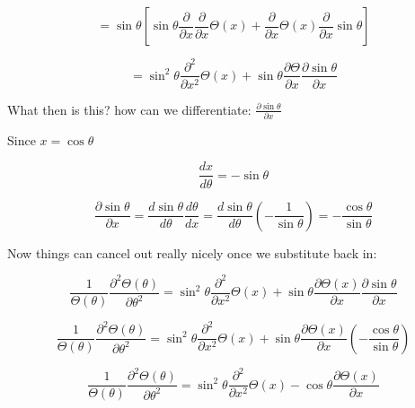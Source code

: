 \documentclass[12pt]{article}
\renewcommand{\_}{\kern-1.5pt\textunderscore\kern-1.5pt}
\begin{document}
 \[ =\sin  \theta  \left[ \sin  \theta \frac{ \partial }{ \partial x}\frac{ \partial }{ \partial x} \Theta  \left( x \right) +\frac{ \partial }{ \partial x} \Theta  \left( x \right) \frac{ \partial }{ \partial x}\sin  \theta  \right]  \] \par

 \[ =\sin ^{2} \theta \frac{ \partial ^{2}}{ \partial x^{2}} \Theta  \left( x \right) +\sin  \theta \frac{ \partial  \Theta }{ \partial x}\frac{ \partial \sin  \theta }{ \partial x} \] \par

What then is this? how can we differentiate:  \( \frac{ \partial \sin  \theta }{ \partial x} \) \par

Since  \( x=\cos  \theta  \) \par

 \[ \frac{dx}{d \theta }=-\sin  \theta  \] \par

 \[ \frac{ \partial \sin  \theta }{ \partial x}=\frac{d\sin  \theta }{d \theta }\frac{d \theta }{dx}=\frac{d\sin  \theta }{d \theta } \left( -\frac{1}{\sin  \theta } \right) =-\frac{\cos  \theta }{\sin  \theta } \] \par

Now things can cancel out really nicely once we substitute back in:\par

 \[ \frac{1}{ \Theta  \left(  \theta  \right) }\frac{ \partial ^{2} \Theta  \left(  \theta  \right) }{ \partial  \theta ^{2}}=\sin ^{2} \theta \frac{ \partial ^{2}}{ \partial x^{2}} \Theta  \left( x \right) +\sin  \theta \frac{ \partial  \Theta  \left( x \right) }{ \partial x}\frac{ \partial \sin  \theta }{ \partial x} \] \par

 \[ \frac{1}{ \Theta  \left(  \theta  \right) }\frac{ \partial ^{2} \Theta  \left(  \theta  \right) }{ \partial  \theta ^{2}}=\sin ^{2} \theta \frac{ \partial ^{2}}{ \partial x^{2}} \Theta  \left( x \right) +\sin  \theta \frac{ \partial  \Theta  \left( x \right) }{ \partial x} \left( -\frac{\cos  \theta }{\sin  \theta } \right)  \] \par

 \[ \frac{1}{ \Theta  \left(  \theta  \right) }\frac{ \partial ^{2} \Theta  \left(  \theta  \right) }{ \partial  \theta ^{2}}=\sin ^{2} \theta \frac{ \partial ^{2}}{ \partial x^{2}} \Theta  \left( x \right) -\cos  \theta \frac{ \partial  \Theta  \left( x \right) }{ \partial x} \] \par
\end{document}
